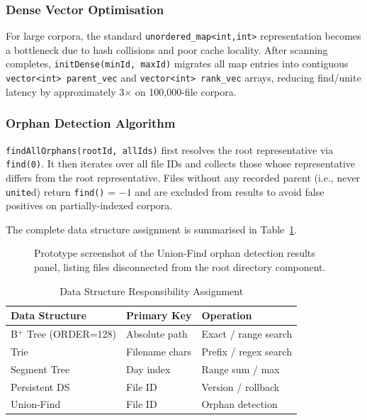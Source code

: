 \documentclass[conference]{IEEEtran}
\begin{document}
\subsubsection{Dense Vector Optimisation}
For large corpora, the standard \texttt{unordered\_map<int,int>} representation becomes a bottleneck due to hash collisions and poor cache locality. After scanning completes, \texttt{initDense(minId, maxId)} migrates all map entries into contiguous \texttt{vector<int> parent\_vec} and \texttt{vector<int> rank\_vec} arrays, reducing find/unite latency by approximately 3$\times$ on 100{,}000-file corpora.

\subsubsection{Orphan Detection Algorithm}
\texttt{findAllOrphans(rootId, allIds)} first resolves the root representative via \texttt{find(0)}. It then iterates over all file IDs and collects those whose representative differs from the root representative. Files without any recorded parent (i.e., never \texttt{unite}d) return \texttt{find()} = $-1$ and are excluded from results to avoid false positives on partially-indexed corpora.

The complete data structure assignment is summarised in Table~\ref{tab:ds_assignment}.

\begin{figure}[htbp]
\centering
{}
\caption{Prototype screenshot of the Union-Find orphan detection results panel, listing files disconnected from the root directory component.}
\label{fig:ui_orphan}
\end{figure}

\begin{table}[htbp]
\caption{Data Structure Responsibility Assignment}
\label{tab:ds_assignment}
\centering
\begin{tabular}{@{}lll@{}}
\toprule
\textbf{Data Structure} & \textbf{Primary Key} & \textbf{Operation} \\
\midrule
B$^+$ Tree (ORDER=128) & Absolute path & Exact / range search \\
Trie & Filename chars & Prefix / regex search \\
Segment Tree & Day index & Range sum / max \\
Persistent DS & File ID & Version / rollback \\
Union-Find & File ID & Orphan detection \\
\bottomrule
\end{tabular}
\end{table}
\end{document}
